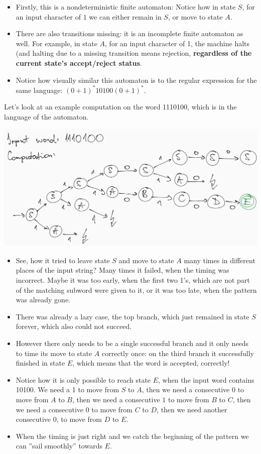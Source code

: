 \begin{itemize}
    \item Firstly, this is a nondeterministic finite automaton: Notice how in state $S$, for an input character of $1$ we can either remain in $S$, or move to state $A$.
    \item There are also transitions missing: it is an incomplete finite automaton as well. For example, in state $A$, for an input character of 1, the machine halts (and halting due to a missing transition means rejection, \textbf{regardless of the current state's accept/reject status}.
    \item Notice how visually similar this automaton is to the regular expression for the same language: $(0+1)^*10100(0+1)^*$.
\end{itemize}

Let's look at an example computation on the word 1110100, which is in the language of the automaton.

\includegraphics[width=\linewidth]{02/computation_1110100.png}

\begin{itemize}
    \item See, how it tried to leave state $S$ and move to state $A$ many times in different places of the input string? Many times it failed, when the timing was incorrect. Maybe it was too early, when the first two 1's, which are not part of the matching subword were given to it, or it was too late, when the pattern was already gone.
    \item There was already a lazy case, the top branch, which just remained in state $S$ forever, which also could not succeed.
    \item However there only needs to be a single successful branch and it only needs to time its move to state $A$ correctly once: on the third branch it successfully finished in state $E$, which means that the word is accepted, correctly!
    \item Notice how it is only possible to reach state $E$, when the input word contains 10100. We need a 1 to move from $S$ to $A$, then we need a consecutive $0$ to move from $A$ to $B$, then we need a consecutive $1$ to move from $B$ to $C$, then we need a consecutive $0$ to move from $C$ to $D$, then we need another consecutive $0$, to move from $D$ to $E$.
    \item When the timing is just right and we catch the beginning of the pattern we can ''sail smoothly'' towards $E$.
\end{itemize}

